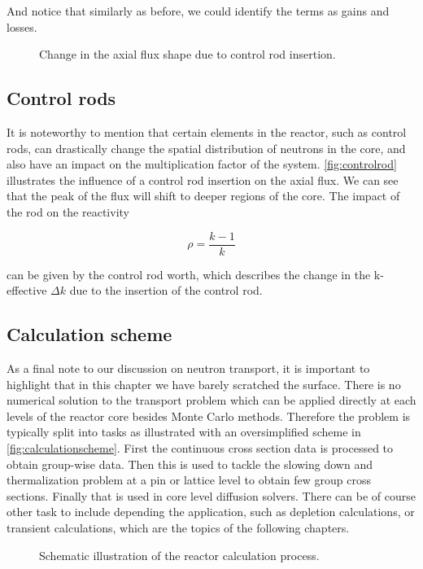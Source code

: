 And notice that similarly as before, we could identify the terms as gains and losses.


\begin{figure}[ht!]
\protect {}\protect
\caption{\label{fig:controlrod} \footnotesize{Change in the axial flux shape due to control rod insertion.}}
\end{figure}

\subsection{Control rods}

It is noteworthy to mention that certain elements in the reactor, such as control rods, can drastically change the spatial distribution of neutrons in the core, and also have an impact on the multiplication factor of the system. \autoref{fig:controlrod} illustrates the influence of a control rod insertion on the axial flux. We can see that the peak of the flux will shift to deeper regions of the core. The impact of the rod on the reactivity 

\[
\rho=\frac{k-1}{k}
\]

\noindent can be given by the control rod worth, which describes the change in the k-effective $\Delta k$ due to the insertion of the control rod.  

\subsection{Calculation scheme}

As a final note to our discussion on neutron transport, it is important to highlight that in this chapter we have barely scratched the surface. There is no numerical solution to the transport problem which can be applied directly at each levels of the reactor core besides Monte Carlo methods. Therefore the problem is typically split into tasks as illustrated with an oversimplified scheme in \autoref{fig:calculationscheme}. First the continuous cross section data is processed to obtain group-wise data. Then this is used to tackle the slowing down and thermalization problem at a pin or lattice level to obtain few group cross sections. Finally that is used in core level diffusion solvers. There can be of course other task to include depending the application, such as depletion calculations, or transient calculations, which are the topics of the following chapters.

\begin{figure}[ht!]
\protect {}\protect
\caption{\label{fig:calculationscheme} \footnotesize{Schematic illustration of the reactor calculation process.}}
\end{figure} 


%
